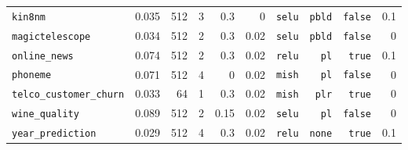 \begin{table}[htbp]
\begin{tabular}{lrrrrrrrrr}
\texttt{kin8nm} & 0.035 & 512 & 3 & 0.3 & 0 & \texttt{selu} & \texttt{pbld} & \texttt{false} & 0.1 \\
\texttt{magictelescope} & 0.034 & 512 & 2 & 0.3 & 0.02 & \texttt{selu} & \texttt{pbld} & \texttt{false} & 0 \\
\texttt{online\_news} & 0.074 & 512 & 2 & 0.3 & 0.02 & \texttt{relu} & \texttt{pl} & \texttt{true} & 0.1 \\
\texttt{phoneme} & 0.071 & 512 & 4 & 0 & 0.02 & \texttt{mish} & \texttt{pl} & \texttt{false} & 0 \\
\texttt{telco\_\allowbreak customer\_\allowbreak churn} & 0.033 & 64 & 1 & 0.3 & 0.02 & \texttt{mish} & \texttt{plr} & \texttt{true} & 0 \\
\texttt{wine\_quality} & 0.089 & 512 & 2 & 0.15 & 0.02 & \texttt{selu} & \texttt{pl} & \texttt{false} & 0 \\
\texttt{year\_\allowbreak prediction} & 0.029 & 512 & 4 & 0.3 & 0.02 & \texttt{relu} & \texttt{none} & \texttt{true} & 0.1 \\
\bottomrule
\end{tabular}
\end{table}

